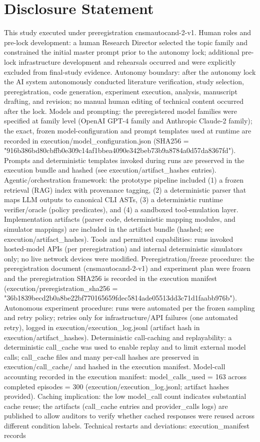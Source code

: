 \documentclass[conference]{IEEEtran}
\begin{document}
\section*{Disclosure Statement}
This study executed under preregistration cnsmautocand-2-v1. Human roles and pre-lock development: a human Research Director selected the topic family and constrained the initial master prompt prior to the autonomy lock; additional pre-lock infrastructure development and rehearsals occurred and were explicitly excluded from final-study evidence. Autonomy boundary: after the autonomy lock the AI system autonomously conducted literature verification, study selection, preregistration, code generation, experiment execution, analysis, manuscript drafting, and revision; no manual human editing of technical content occurred after the lock. Models and prompting: the preregistered model families were specified at family level (OpenAI GPT-4 family and Anthropic Claude-2 family); the exact, frozen model-configuration and prompt templates used at runtime are recorded in execution/model\_configuration.json (SHA256 = "916b386bd80cbffb0e309c14af1bbea4090e342beb73b9a8784a0d57da8367fd"). Prompts and deterministic templates invoked during runs are preserved in the execution bundle and hashed (see execution/artifact\_hashes entries). Agentic/orchestration framework: the prototype pipeline included (1) a frozen retrieval (RAG) index with provenance tagging, (2) a deterministic parser that maps LLM outputs to canonical CLI ASTs, (3) a deterministic runtime verifier/oracle (policy predicates), and (4) a sandboxed tool-emulation layer. Implementation artifacts (parser code, deterministic mapping modules, and simulator mappings) are included in the artifact bundle (hashed; see execution/artifact\_hashes). Tools and permitted capabilities: runs invoked hosted-model APIs (per preregistration) and internal deterministic simulators only; no live network devices were modified. Preregistration/freeze procedure: the preregistration document (cnsmautocand-2-v1) and experiment plan were frozen and the preregistration SHA256 is recorded in the execution manifest (execution/preregistration\_sha256 = "36b1839becd2b0a8be22bf770165659fdec5814ade05513dd3c71d1faabb976b"). Autonomous experiment procedure: runs were automated per the frozen sampling and retry policy; retries only for infrastructure/API failures (one automated retry), logged in execution/execution\_log.jsonl (artifact hash in execution/artifact\_hashes). Deterministic call-caching and replayability: a deterministic call\_cache was used to enable replay and to limit external model calls; call\_cache files and many per-call hashes are preserved in execution/call\_cache/ and hashed in the execution manifest. Model-call accounting recorded in the execution manifest: model\_calls\_used = 163 across completed episodes = 300 (execution/execution\_log.jsonl; artifact hashes provided). Caching implication: the low model\_call count indicates substantial cache reuse; the artifacts (call\_cache entries and provider\_calls logs) are published to allow auditors to verify whether cached responses were reused across different condition labels. Technical restarts and deviations: execution\_manifest records 
\end{document}
